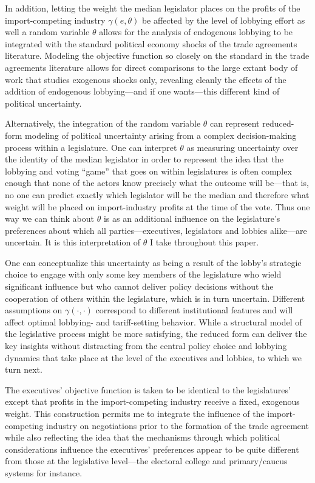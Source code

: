 \documentclass[10pt]{article}
\newcommand{\ve}{\theta}
\newcommand{\ta}{\theta}
\newcommand{\ga}{\gamma}
\begin{document}
In addition, letting the weight the median legislator places on the profits of the import-competing industry $\ga(e,\ve)$ be affected by the level of lobbying effort as well a random variable $\ta$ allows for the analysis of endogenous lobbying to be integrated with the standard political economy shocks of the trade agreements literature. Modeling the objective function so closely on the standard in the trade agreements literature allows for direct comparisons to the large extant body of work that studies exogenous shocks only, revealing cleanly the effects of the addition of endogenous lobbying---and if one wants---this different kind of political uncertainty.

Alternatively, the integration of the random variable $\ta$ can represent reduced-form modeling of political uncertainty arising from a complex decision-making process within a legislature. One can interpret $\ta$ as measuring uncertainty over the identity of the median legislator in order to represent the idea that the lobbying and voting ``game'' that goes on within legislatures is often complex enough that none of the actors know precisely what the outcome will be---that is, no one can predict exactly which legislator will be the median and therefore what weight will be placed on import-industry profits at the time of the vote. Thus one way we can think about $\ta$ is as an additional influence on the legislature's preferences about which all parties---executives, legislators and lobbies alike---are uncertain. It is this interpretation of $\ta$ I take throughout this paper.

One can conceptualize this uncertainty as being a result of the lobby's strategic choice to engage with only some key members of the legislature who wield significant influence but who cannot deliver policy decisions without the cooperation of others within the legislature, which is in turn uncertain. Different assumptions on $\ga(\cdot,\cdot)$ correspond to different institutional features and will affect optimal lobbying- and tariff-setting behavior. While a structural model of the legislative process might be more satisfying, the reduced form can deliver the key insights without distracting from the central policy choice and lobbying dynamics that take place at the level of the executives and lobbies, to which we turn next. 

The executives' objective function is taken to be identical to the legislatures' except that profits in the import-competing industry receive a fixed, exogenous weight. This construction permits me to integrate the influence of the import-competing industry on negotiations prior to the formation of the trade agreement while also reflecting the idea that the mechanisms through which political considerations influence the executives' preferences appear to be quite different from those at the legislative level---the electoral college and primary/caucus systems for instance.
\end{document}
